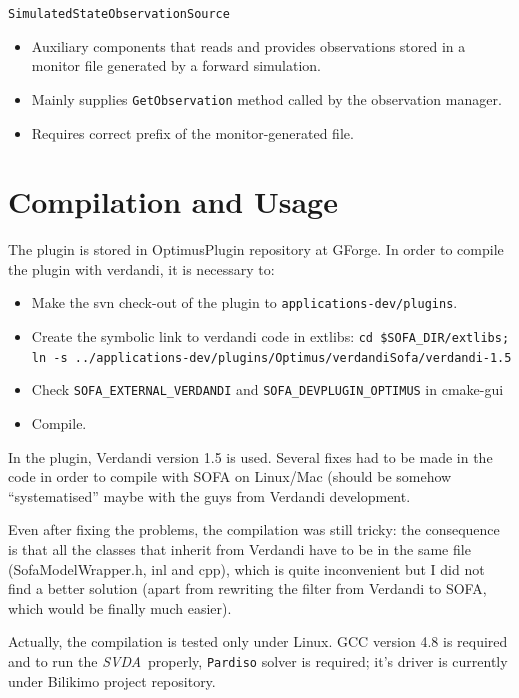 \documentclass[10pt]{article}
\def\svda{\textit{SVDA}}
\begin{document}
\medskip
{\large\texttt{SimulatedStateObservationSource}}
\begin{itemize}
\item Auxiliary components that reads and provides observations stored in a monitor file generated by a forward simulation.
\item Mainly supplies \texttt{GetObservation} method called by the observation manager. 
\item Requires correct prefix of the monitor-generated file. 
\end{itemize}

\section{Compilation and Usage}
The plugin is stored in OptimusPlugin repository at GForge. In order to compile the plugin with verdandi, it is necessary to:
\begin{itemize}
\item Make the svn check-out of the plugin to \texttt{applications-dev/plugins}.
\item Create the symbolic link to verdandi code in extlibs: \newline \texttt{cd \$SOFA\_DIR/extlibs; \newline ln -s
../applications-dev/plugins/Optimus/verdandiSofa/verdandi-1.5}
\item Check \texttt{SOFA\_EXTERNAL\_VERDANDI} and \texttt{SOFA\_DEVPLUGIN\_OPTIMUS} in cmake-gui
\item Compile.
\end{itemize}

In the plugin, Verdandi version 1.5 is used. Several fixes had to be made in the code in order to compile with SOFA on Linux/Mac (should be somehow
``systematised'' maybe with the guys from Verdandi development.

Even after fixing the problems, the compilation was still tricky: the consequence is that all the classes that inherit from Verdandi have to be in the
same file (SofaModelWrapper.h, inl and cpp), which is quite inconvenient but I did not find a better solution (apart from rewriting the filter from
Verdandi to SOFA, which would be finally much easier). 

Actually, the compilation is tested only under Linux. GCC version 4.8 is required and to run the \svda\ properly, \texttt{Pardiso} solver is required; it's driver is currently under Bilikimo project repository. 


\end{document}
